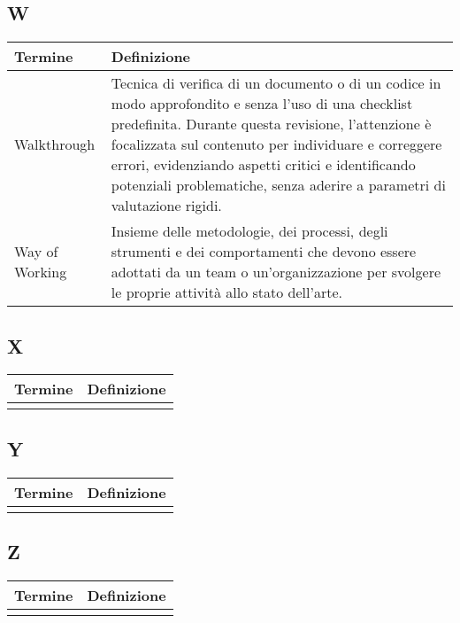 \documentclass[10pt]{article}
\begin{document}
\subsection{W} %
\begin{longtable}{|>{\centering\arraybackslash}m{2.5cm}|>{\arraybackslash}m{12.5cm}|}
\hline
\rowcolor[gray]{0.8}
\textbf{Termine} & \textbf{Definizione}\\
\endhead
\hline
Walkthrough & Tecnica di verifica di un documento o di un codice in modo approfondito e senza l'uso di una checklist predefinita. Durante questa revisione, l'attenzione è focalizzata sul contenuto per individuare e correggere errori, evidenziando aspetti critici e identificando potenziali problematiche, senza aderire a parametri di valutazione rigidi.\\
\hline
Way of Working & Insieme delle metodologie, dei processi, degli strumenti e dei comportamenti che devono essere adottati da un team o un'organizzazione per svolgere le proprie attività allo stato dell'arte.\\
\hline
\end{longtable}

\subsection{X} %
\begin{longtable}{|>{\centering\arraybackslash}m{2.5cm}|>{\arraybackslash}m{12.5cm}|}
\hline
\rowcolor[gray]{0.8}
\textbf{Termine} & \textbf{Definizione}\\
\endhead
\hline
 & \\
\hline
\end{longtable}

\newpage %
\subsection{Y} %
\begin{longtable}{|>{\centering\arraybackslash}m{2.5cm}|>{\arraybackslash}m{12.5cm}|}
\hline
\rowcolor[gray]{0.8}
\textbf{Termine} & \textbf{Definizione}\\
\endhead
\hline
 & \\
\hline
\end{longtable}

\subsection{Z} %
\begin{longtable}{|>{\centering\arraybackslash}m{2.5cm}|>{\arraybackslash}m{12.5cm}|}
\hline
\rowcolor[gray]{0.8}
\textbf{Termine} & \textbf{Definizione}\\
\endhead
\hline
 & \\
\hline
\end{longtable}
\end{document}
